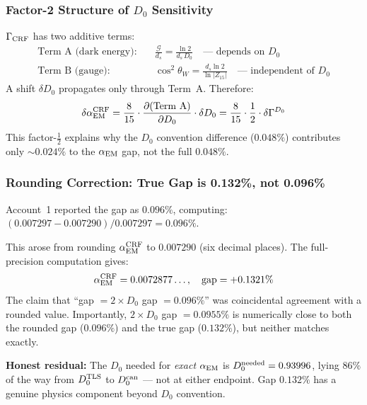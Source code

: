 \documentclass[12pt, a4paper]{article}
\begin{document}
\subsubsection{Factor-2 Structure of $D_0$ Sensitivity}

\begin{derivedbox}[title={FIND-ZC24-ALPHA-03: Why $D_0$ Propagates
  Through Half of $\Gamma_{\rm CRF}$}]
$\Gamma_{\rm CRF}$ has two additive terms:
\begin{align*}
  \text{Term A (dark energy):}\quad
    & \frac{\mathcal{G}}{d_s} = \frac{\ln 2}{d_s\,D_0}
      \quad\text{--- depends on }D_0 \\
  \text{Term B (gauge):}\quad
    & \cos^2\theta_W = \frac{d_s\ln 2}{\ln|Z_{15}|}
      \quad\text{--- independent of }D_0
\end{align*}
A shift $\delta D_0$ propagates only through Term~A.
Therefore:
\[
  \delta\alpha_{\rm EM}^{\rm CRF}
  = \frac{8}{15}\cdot\frac{\partial(\text{Term A})}{\partial D_0}
    \cdot\delta D_0
  = \frac{8}{15}\cdot\frac{1}{2}\cdot\delta\Gamma^{D_0}
\]
This factor-$\frac{1}{2}$ explains why the $D_0$ convention
difference ($0.048\%$) contributes only $\sim 0.024\%$ to the
$\alpha_{\rm EM}$ gap, not the full $0.048\%$.
\end{derivedbox}

\subsubsection{Rounding Correction: True Gap is 0.132\%, not 0.096\%}

\begin{keybox}[title={PM-ZC24-ALPHA-01 (Phase Misalignment):
  Rounding Artifact in Earlier Session}]
Account~1 reported the gap as $0.096\%$, computing:
$(0.007297 - 0.007290)/0.007297 = 0.096\%$.

This arose from rounding $\alpha_{\rm EM}^{\rm CRF}$ to $0.007290$
(six decimal places). The full-precision computation gives:
\[
  \alpha_{\rm EM}^{\rm CRF} = 0.0072877\ldots,
  \quad
  \text{gap} = +0.1321\%
\]
The claim that ``gap $= 2\times D_0$ gap $= 0.096\%$'' was
coincidental agreement with a rounded value.
Importantly, $2\times D_0$ gap $= 0.0955\%$ is numerically close
to both the rounded gap ($0.096\%$) and the true gap ($0.132\%$),
but neither matches exactly.

\medskip
\textbf{Honest residual:} The $D_0$ needed for \emph{exact}
$\alpha_{\rm EM}$ is $D_0^{\rm needed}=0.93996$, lying $86\%$
of the way from $D_0^{\rm TLS}$ to $D_0^{\rm can}$ --- not at
either endpoint. Gap $0.132\%$ has a genuine physics component
beyond $D_0$ convention.
\end{keybox}
\end{document}
